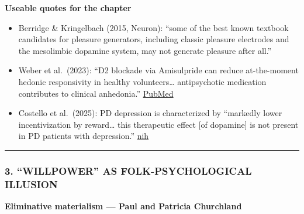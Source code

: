 \textbf{Useable quotes for the chapter}

\begin{itemize}
\tightlist
\item
  Berridge \& Kringelbach (2015, Neuron): ``some of the best known textbook candidates for pleasure generators, including classic pleasure electrodes and the mesolimbic dopamine system, may not generate pleasure after all.''
\item
  Weber et al.~(2023): ``D2 blockade via Amisulpride can reduce at-the-moment hedonic responsivity in healthy volunteers\ldots{} antipsychotic medication contributes to clinical anhedonia.'' \href{https://pubmed.ncbi.nlm.nih.gov/36680855/}{PubMed}
\item
  Costello et al.~(2025): PD depression is characterized by ``markedly lower incentivization by reward\ldots{} this therapeutic effect {[}of dopamine{]} is not present in PD patients with depression.'' \href{https://www.ncbi.nlm.nih.gov/pmc/articles/PMC12129732/}{nih}
\end{itemize}

\begin{center}\rule{0.5\linewidth}{0.5pt}\end{center}

\subsubsection{3. ``WILLPOWER'' AS FOLK-PSYCHOLOGICAL ILLUSION}\label{07_pleasure_and_self-willpower-as-folk-psychological-illusion}

\textbf{Eliminative materialism --- Paul and Patricia Churchland}

